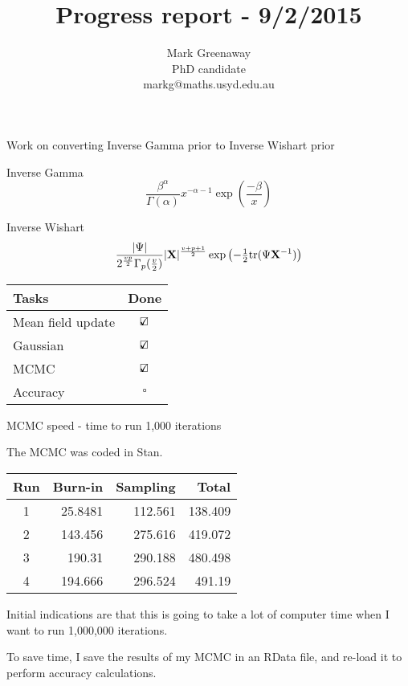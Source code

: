 \documentclass{beamer}
\title{Progress report - 9/2/2015}
\author{Mark Greenaway\\PhD candidate\\markg@maths.usyd.edu.au}
\begin{document}
\begin{frame}
\maketitle
\end{frame}

\begin{frame}{Work on converting Inverse Gamma prior to Inverse Wishart prior}

Inverse Gamma $$\frac{\beta^\alpha}{\Gamma{(\alpha)}} x^{-\alpha-1} \exp{\left(\frac{-\beta}{x}\right)}$$

Inverse Wishart $$
\frac{|\Psi|}{2^{\frac{vp}{2}} \Gamma_p {(\frac{v}{2})}} |{\bf X}|^{\frac{v + p + 1}{2}}
\exp{\left(-  \tfrac{1}{2} \text{tr}{(\Psi {\bf X}^{-1})} \right)}
$$

\begin{tabular}{l|c}
Tasks & Done \\
\hline
Mean field update & $\text{\rlap{$\checkmark$}}\square$ \\
Gaussian & $\text{\rlap{$\checkmark$}}\square$ \\
MCMC & $\text{\rlap{$\checkmark$}}\square$ \\
Accuracy & $\square$ \\
\end{tabular}
\end{frame}

\begin{frame}{MCMC speed - time to run 1,000 iterations}

The MCMC was coded in Stan.

\begin{tabular}{c|rrr}
Run & Burn-in & Sampling & Total \\
\hline
1 & 25.8481
& 112.561
& 138.409\\

2 & 143.456
& 275.616
& 419.072\\

3 & 190.31&
290.188&
480.498\\

4 &  194.666
& 296.524
& 491.19\\
\end{tabular}

Initial indications are that this is going to take a lot of computer time when I want
to run 1,000,000 iterations.

To save time, I save the results of my MCMC in an RData file, and re-load it to perform
accuracy calculations.
\end{frame}
\end{document}
